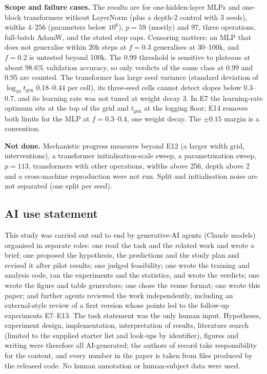 \documentclass{article}
\begin{document}
\textbf{Scope and failure cases.} The results are for one-hidden-layer MLPs and one-block transformers without LayerNorm (plus a depth-2 control with 3 seeds), widths $4$--$256$ (parameters below $10^6$), $p=59$ (mostly) and $97$, three operations, full-batch AdamW, and the stated step caps. Censoring matters: an MLP that does not generalise within 20k steps at $f=0.3$ generalises at 30--100k, and $f=0.2$ is untested beyond 100k. The 0.99 threshold is sensitive to plateaus at about 98.6\% validation accuracy, so only verdicts of the same class at 0.99 and 0.95 are counted. The transformer has large seed variance (standard deviation of $\log_{10}t_{\mathrm{gen}}$ 0.18--0.44 per cell), its three-seed cells cannot detect slopes below 0.3--0.7, and its learning rate was not tuned at weight decay 3. In E7 the learning-rate optimum sits at the top of the grid and $t_{\mathrm{gen}}$ at the logging floor; E14 removes both limits for the MLP at $f=0.3$--$0.4$, one weight decay. The $\pm0.15$ margin is a convention.

\textbf{Not done.} Mechanistic progress measures beyond E12 (a larger width grid, interventions), a transformer initialisation-scale sweep, a parametrisation sweep, $p=113$, transformers with other operations, widths above 256, depth above 2 and a cross-machine reproduction were not run. Split and initialisation noise are not separated (one split per seed).

\subsection*{AI use statement}
This study was carried out end to end by generative-AI agents (Claude models) organised in separate roles: one read the task and the related work and wrote a brief; one proposed the hypothesis, the predictions and the study plan and revised it after pilot results; one judged feasibility; one wrote the training and analysis code, ran the experiments and the statistics, and wrote the verdicts; one wrote the figure and table generators; one chose the venue format; one wrote this paper; and further agents reviewed the work independently, including an external-style review of a first version whose points led to the follow-up experiments E7--E13. The task statement was the only human input. Hypotheses, experiment design, implementation, interpretation of results, literature search (limited to the supplied starter list and look-ups by identifier), figures and writing were therefore all AI-generated; the authors of record take responsibility for the content, and every number in the paper is taken from files produced by the released code. No human annotation or human-subject data were used.
\end{document}
